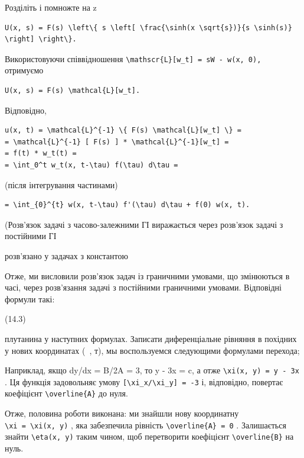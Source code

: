 \documentclass[
  ukrainian,
]{article}
\begin{document}
Розділіть і помножте на z

\begin{verbatim}
U(x, s) = F(s) \left\{ s \left[ \frac{\sinh(x \sqrt{s})}{s \sinh(s)} \right] \right\}.
\end{verbatim}

Використовуючи співвідношення
\texttt{\textbackslash{}mathscr\{L\}{[}w\_t{]}\ =\ sW\ -\ w(x,\ 0),}
отримуємо

\begin{verbatim}
U(x, s) = F(s) \mathcal{L}[w_t].
\end{verbatim}

Відповідно,

\begin{verbatim}
u(x, t) = \mathcal{L}^{-1} \{ F(s) \mathcal{L}[w_t] \} =
= \mathcal{L}^{-1} [ F(s) ] * \mathcal{L}^{-1}[w_t] =
= f(t) * w_t(t) =
= \int_0^t w_t(x, t-\tau) f(\tau) d\tau =
\end{verbatim}

(після інтегрування частинами)

\begin{verbatim}
= \int_{0}^{t} w(x, t-\tau) f'(\tau) d\tau + f(0) w(x, t).
\end{verbatim}

(Розв'язок задачі з часово-залежними ГІ виражається через розв'язок
задачі з постійними ГІ

розв'язано у задачах з константою

Отже, ми висловили розв'язок задач із граничними умовами, що змінюються
в часі, через розв'язання задачі з постійними граничними умовами.
Відповідні формули такі:

(14.3)

плутанина у наступних формулах. Записати диференціальне рівняння в
похідних у нових координатах (~, т), мы воспользуемся следующими
формулами перехода;

Наприклад, якщо dy/dx = B/2A = 3, то y - 3x = c, а отже
\texttt{\textbackslash{}xi(x,\ y)\ =\ y\ -\ 3x} . Ця функція задовольняє
умову \texttt{{[}\textbackslash{}xi\_x/\textbackslash{}xi\_y{]}\ =\ -3}
і, відповідно, повертає коефіцієнт
\texttt{\textbackslash{}overline\{A\}} до нуля.

Отже, половина роботи виконана: ми знайшли нову координатну
\texttt{\textbackslash{}xi\ =\ \textbackslash{}xi(x,\ y)} , яка
забезпечила рівність \texttt{\textbackslash{}overline\{A\}\ =\ 0} .
Залишається знайти \texttt{\textbackslash{}eta(x,\ y)} таким чином, щоб
перетворити коефіцієнт \texttt{\textbackslash{}overline\{B\}} на нуль.
\end{document}
